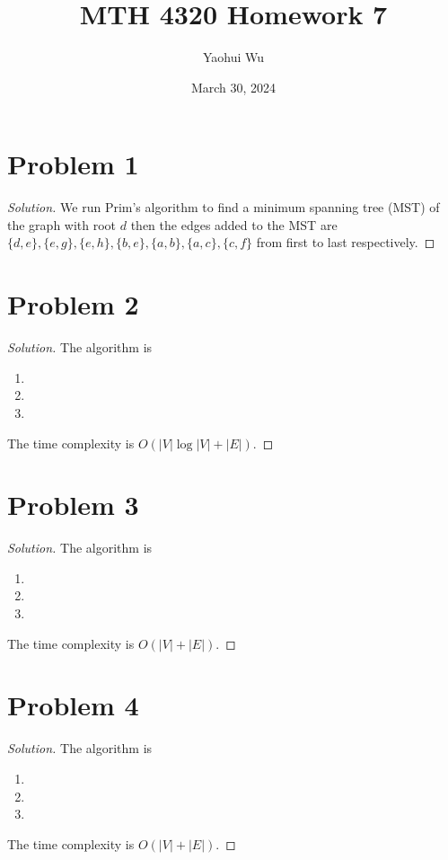 \documentclass[12pt]{article}
\title{MTH 4320 Homework 7}
\author{Yaohui Wu}
\date{March 30, 2024}
\newenvironment*{solution}{\begin{proof}[Solution]}{\end{proof}}
\begin{document}
\maketitle
\section*{Problem 1}
\begin{solution}
    We run Prim's algorithm to find a minimum spanning tree (MST) of the graph
    with root \(d\) then the edges added to the MST are \(\{d,e\},\{e,g\},\{e,
    h\},\{b,e\},\{a,b\},\{a,c\},\{c,f\}\) from first to last respectively.
\end{solution}
\section*{Problem 2}
\begin{solution}
    The algorithm is
    \begin{enumerate}
        \item 
        \item 
        \item 
    \end{enumerate}
    The time complexity is \(O(|V|\log|V|+|E|)\).
\end{solution}
\section*{Problem 3}
\begin{solution}
    The algorithm is
    \begin{enumerate}
        \item 
        \item 
        \item 
    \end{enumerate}
    The time complexity is \(O(|V|+|E|)\).
\end{solution}
\section*{Problem 4}
\begin{solution}
    The algorithm is
    \begin{enumerate}
        \item 
        \item 
        \item
    \end{enumerate}
    The time complexity is \(O(|V|+|E|)\).
\end{solution}
\end{document}
